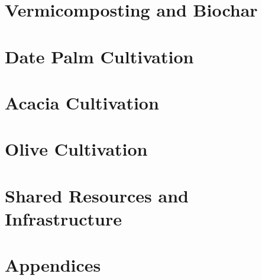 \documentclass[12pt,a4paper]{report}
\begin{document}
\chapter{Vermicomposting and Biochar}









\chapter{Date Palm Cultivation}









\chapter{Acacia Cultivation}









\chapter{Olive Cultivation}









\chapter{Shared Resources and Infrastructure}









\chapter{Appendices}




\end{document}
